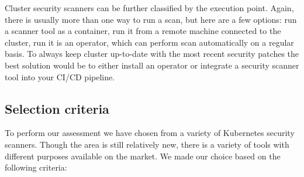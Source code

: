Cluster security scanners can be further classified by the execution point. Again, there is usually more than one way to run a scan, but here are a few options: run a scanner tool as a container, run it from a remote machine connected to the cluster, run it is an operator, which can perform scan automatically on a regular basis. To always keep cluster up-to-date with the most recent security patches the best solution would be to either install an operator or integrate a security scanner tool into your CI/CD pipeline.

\subsection{Selection criteria}

To perform our assessment we have chosen from a variety of Kubernetes security scanners. Though the area is still relatively new, there is a variety of tools with different purposes available on the market. We made our choice based on the following criteria:
